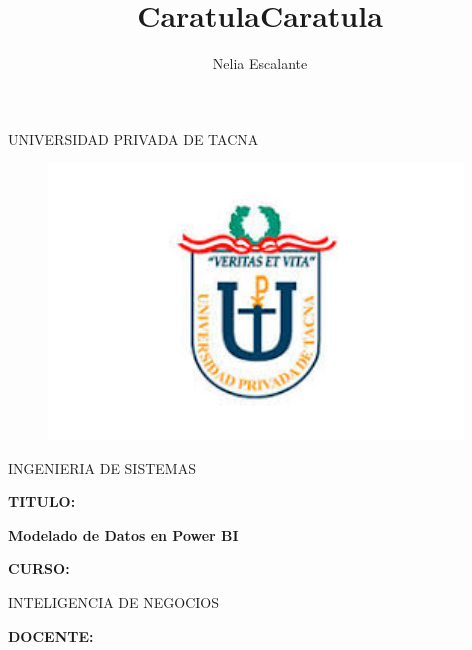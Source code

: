 \documentclass[12pt,letterpaper]{article}
\author{Nelia Escalante}
\title{Caratula}
\begin{document}
\title{Caratula}

\begin{titlepage}
\begin{center}
\large{UNIVERSIDAD PRIVADA DE TACNA}\\
\vspace*{-0.025in}
\begin{figure}[htb]
\begin{center}
\includegraphics[width=11cm]{./IMG/logo}
\end{center}
\end{figure}
\Large INGENIERIA DE SISTEMAS  \\

\vspace*{0.5in}
\begin{large}
\textbf{TITULO:} \\
\end{large}

\vspace*{0.1in}
\begin{Large}
\textbf{Modelado de Datos en Power BI} \\
\end{Large}

\vspace*{0.3in}
\begin{Large}
\textbf{CURSO:} \\
\end{Large}

\vspace*{0.1in}
\begin{large}
INTELIGENCIA DE NEGOCIOS\\
\end{large}

\vspace*{0.3in}
\begin{Large}
\textbf{DOCENTE:} \\
\end{Large}


\end{center}
\end{titlepage}
\end{document}
